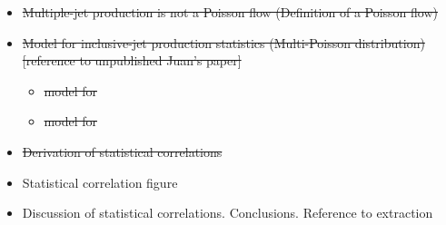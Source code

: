 \begin{itemize}	\itemsep-5pt \parskip0pt
	\item \st{Multiple-jet production is not a Poisson flow (Definition of a Poisson flow)}
	\item \st{Model for inclusive-jet production statistics (Multi-Poisson distribution) [reference to unpublished Juan's paper]}
		\begin{itemize} \itemsep-5pt \parskip0pt
			\item \st{model for \qsq}
			\item \st{model for \etjet}
		\end{itemize}
  \item \st{Derivation of statistical correlations}
	\item Statistical correlation figure
	\item Discussion of statistical correlations. Conclusions. Reference to \as extraction
\end{itemize}

